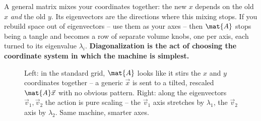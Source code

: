 \begin{intuitionbox}
A general matrix mixes your coordinates together: the new $x$ depends on the old
$x$ \emph{and} the old $y$. Its eigenvectors are the directions where this mixing
stops. If you rebuild space out of eigenvectors -- use them as your axes -- then
$\mat{A}$ stops being a tangle and becomes a row of separate volume knobs, one
per axis, each turned to its eigenvalue $\lambda_i$. \textbf{Diagonalization is
the act of choosing the coordinate system in which the machine is simplest.}
\end{intuitionbox}

\begin{figure}[H]
\centering
{}
\caption{Left: in the standard grid, $\mat{A}$ looks like it stirs the $x$ and
$y$ coordinates together -- a generic $\vec{x}$ is sent to a tilted, rescaled
$\mat{A}\vec{x}$ with no obvious pattern. Right: along the eigenvectors
$\vec{v}_1,\vec{v}_2$ the
action is pure scaling -- the $\vec{v}_1$ axis stretches by $\lambda_1$, the
$\vec{v}_2$ axis by $\lambda_2$. Same machine, smarter axes.}
\label{ch24:fig-eigenview}
\end{figure}

